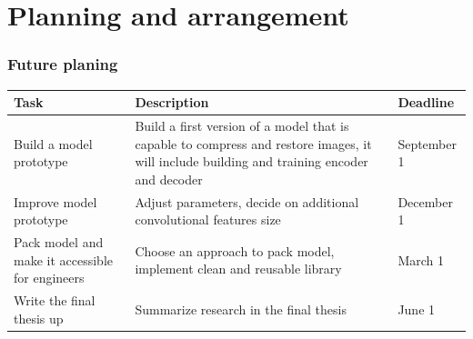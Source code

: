 \documentclass[10pt]{beamer}
\begin{document}
\section{Planning and arrangement}
\begin{frame}
    \frametitle{Future planing}

    \begin{table}
        \centering
        \begin{tabular}{p{3cm}|p{5cm}|p{2cm}}
            \hline
            Task                                            & Description                                                                                                                                & Deadline    \\
            \hline
            Build a model prototype                         & Build a first version of a model that is capable to compress and restore images, it will include building and training encoder and decoder & September 1 \\
            \hline
            Improve model prototype                         & Adjust parameters, decide on additional convolutional features size                                                                        & December 1  \\
            \hline
            Pack model and make it accessible for engineers & Choose an approach to pack model, implement clean and reusable library                                                                     & March 1     \\
            \hline
            Write the final thesis up                       & Summarize research in the final thesis                                                                                                     & June 1      \\
            \hline
        \end{tabular}
    \end{table}

\end{frame}
\end{document}
